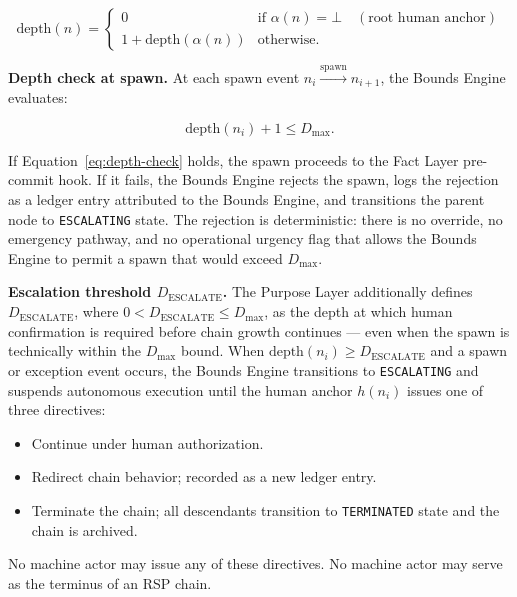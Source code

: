 \begin{equation}
\text{depth}(n) =
\begin{cases}
0 & \text{if } \alpha(n) = \bot \quad (\text{root human anchor}) \\[6pt]
1 + \text{depth}(\alpha(n)) & \text{otherwise}.
\end{cases}
\label{eq:chain-depth}
\end{equation}

\medskip
\noindent\textbf{Depth check at spawn.} At each spawn event $n_i \xrightarrow{\text{spawn}} n_{i+1}$, the Bounds Engine evaluates:

\begin{equation}
\text{depth}(n_i) + 1 \leq D_{\max}.
\label{eq:depth-check}
\end{equation}

If Equation~\ref{eq:depth-check} holds, the spawn proceeds to the Fact Layer pre-commit hook. If it fails, the Bounds Engine rejects the spawn, logs the rejection as a ledger entry attributed to the Bounds Engine, and transitions the parent node to \texttt{ESCALATING} state. The rejection is deterministic: there is no override, no emergency pathway, and no operational urgency flag that allows the Bounds Engine to permit a spawn that would exceed $D_{\max}$.

\medskip
\noindent\textbf{Escalation threshold $D_{\text{ESCALATE}}$.} The Purpose Layer additionally defines $D_{\text{ESCALATE}}$, where $0 < D_{\text{ESCALATE}} \leq D_{\max}$, as the depth at which human confirmation is required before chain growth continues --- even when the spawn is technically within the $D_{\max}$ bound. When $\text{depth}(n_i) \geq D_{\text{ESCALATE}}$ and a spawn or exception event occurs, the Bounds Engine transitions to \texttt{ESCALATING} and suspends autonomous execution until the human anchor $h(n_i)$ issues one of three directives:

\begin{itemize}
    \item[\texttt{ACK}] Continue under human authorization.
    \item[\texttt{RESOLVE}] Redirect chain behavior; recorded as a new ledger entry.
    \item[\texttt{REJECT}] Terminate the chain; all descendants transition to \texttt{TERMINATED} state and the chain is archived.
\end{itemize}

No machine actor may issue any of these directives. No machine actor may serve as the terminus of an RSP chain.

